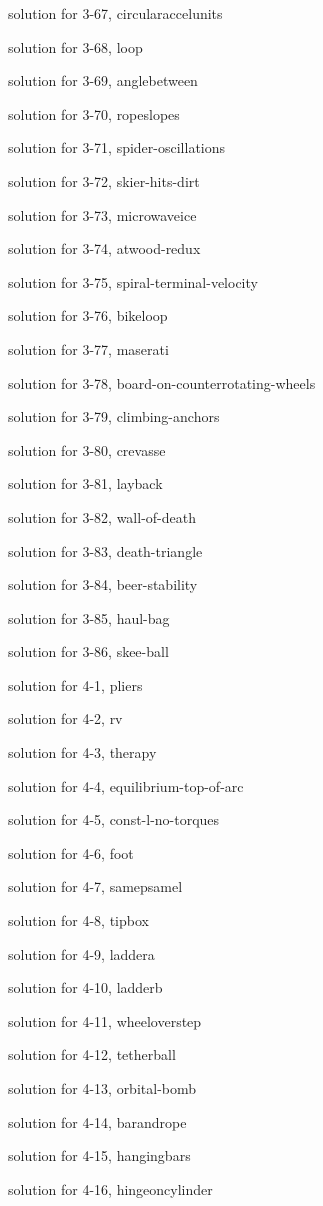 \documentclass{problems}
\begin{document}
solution for 3-67, circularaccelunits

solution for 3-68, loop

solution for 3-69, anglebetween

solution for 3-70, ropeslopes

solution for 3-71, spider-oscillations

solution for 3-72, skier-hits-dirt

solution for 3-73, microwaveice

solution for 3-74, atwood-redux

solution for 3-75, spiral-terminal-velocity

solution for 3-76, bikeloop

solution for 3-77, maserati

solution for 3-78, board-on-counterrotating-wheels

solution for 3-79, climbing-anchors

solution for 3-80, crevasse

solution for 3-81, layback

solution for 3-82, wall-of-death

solution for 3-83, death-triangle

solution for 3-84, beer-stability

solution for 3-85, haul-bag

solution for 3-86, skee-ball

solution for 4-1, pliers

solution for 4-2, rv

solution for 4-3, therapy

solution for 4-4, equilibrium-top-of-arc

solution for 4-5, const-l-no-torques

solution for 4-6, foot

solution for 4-7, samepsamel

solution for 4-8, tipbox

solution for 4-9, laddera

solution for 4-10, ladderb

solution for 4-11, wheeloverstep

solution for 4-12, tetherball

solution for 4-13, orbital-bomb

solution for 4-14, barandrope

solution for 4-15, hangingbars

solution for 4-16, hingeoncylinder
\end{document}
